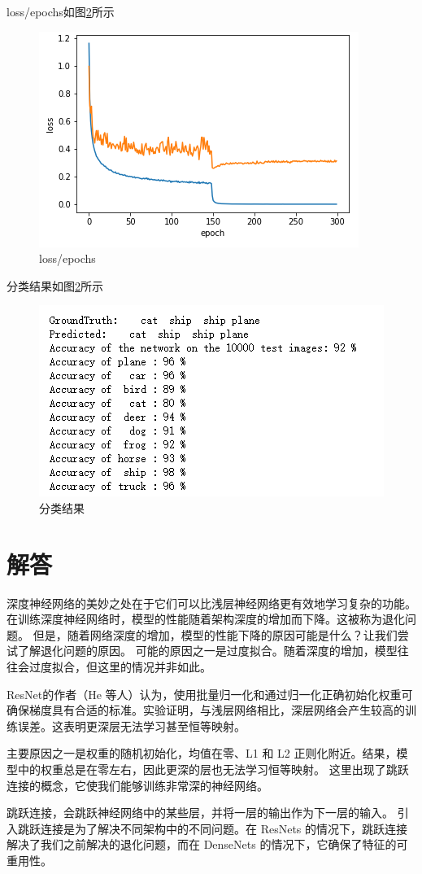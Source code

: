 \documentclass[UTF8,a4paper,10pt]{ctexart}
\begin{document}
loss/epochs如图\ref{fig:1}所示
\begin{figure}[H]
    \centering
    \includegraphics[scale=1]{5.png}
    \caption{loss/epochs}
    \label{fig:1}
\end{figure}

分类结果如图\ref{fig:1}所示
\begin{figure}[H]
    \centering
    \includegraphics[scale=1]{6.png}
    \caption{分类结果}
    \label{fig:1}
\end{figure}




\section{解答}

深度神经网络的美妙之处在于它们可以比浅层神经网络更有效地学习复杂的功能。在训练深度神经网络时，模型的性能随着架构深度的增加而下降。这被称为退化问题。
但是，随着网络深度的增加，模型的性能下降的原因可能是什么？让我们尝试了解退化问题的原因。
可能的原因之一是过度拟合。随着深度的增加，模型往往会过度拟合，但这里的情况并非如此。

ResNet的作者（He 等人）认为，使用批量归一化和通过归一化正确初始化权重可确保梯度具有合适的标准。实验证明，与浅层网络相比，深层网络会产生较高的训练误差。这表明更深层无法学习甚至恒等映射。

主要原因之一是权重的随机初始化，均值在零、L1 和 L2 正则化附近。结果，模型中的权重总是在零左右，因此更深的层也无法学习恒等映射。
这里出现了跳跃连接的概念，它使我们能够训练非常深的神经网络。

跳跃连接，会跳跃神经网络中的某些层，并将一层的输出作为下一层的输入。
引入跳跃连接是为了解决不同架构中的不同问题。在 ResNets 的情况下，跳跃连接解决了我们之前解决的退化问题，而在 DenseNets 的情况下，它确保了特征的可重用性。




\end{document}
